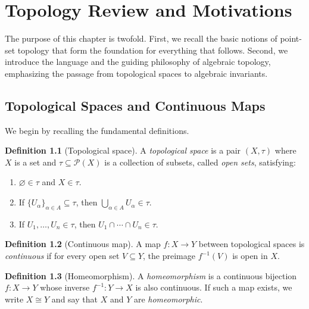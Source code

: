 \documentclass[12pt,a4paper,openany]{book}
\theoremstyle{definition}
\newtheorem{definition}{Definition}[chapter]
\theoremstyle{plain}
\theoremstyle{remark}
\begin{document}
\chapter{Topology Review and Motivations}\label{ch:review}

The purpose of this chapter is twofold. First, we recall the basic notions of
point-set topology that form the foundation for everything that follows.
Second, we introduce the language and the guiding philosophy of algebraic
topology, emphasizing the passage from topological spaces to algebraic
invariants.

\section{Topological Spaces and Continuous Maps}\label{sec:top-spaces}

We begin by recalling the fundamental definitions.

\begin{definition}[Topological space]\label{def:topological-space}
A \emph{topological space} is a pair $(X, \tau)$ where
$X$ is a set and $\tau \subseteq \mathcal{P}(X)$ is a collection of subsets,
called \emph{open sets}, satisfying:
\begin{enumerate}[label=(\roman*)]
\item $\varnothing \in \tau$ and $X \in \tau$.
\item If $\{U_\alpha\}_{\alpha \in A} \subseteq \tau$, then
  $\bigcup_{\alpha \in A} U_\alpha \in \tau$.
\item If $U_1, \ldots, U_n \in \tau$, then $U_1 \cap \cdots \cap U_n \in \tau$.
\end{enumerate}
\end{definition}

\begin{definition}[Continuous map]\label{def:continuous-map}
A map $f \colon X \to Y$ between topological spaces is \emph{continuous}
if for every open set $V \subseteq Y$, the preimage $f^{-1}(V)$ is open in $X$.
\end{definition}

\begin{definition}[Homeomorphism]\label{def:homeomorphism}
A \emph{homeomorphism} is a continuous bijection
$f \colon X \to Y$ whose inverse $f^{-1} \colon Y \to X$ is also continuous.
If such a map exists, we write $X \cong Y$ and say that $X$ and $Y$ are
\emph{homeomorphic}.
\end{definition}
\end{document}
